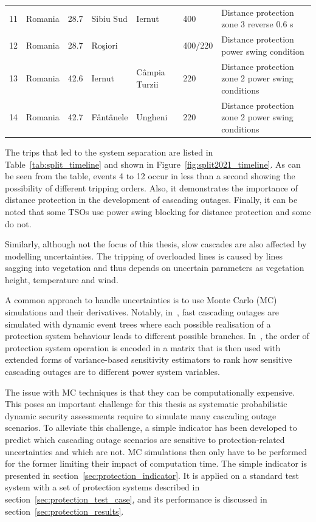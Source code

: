 \begin{table}
\begin{adjustbox}{max width=\textwidth}
\begin{tabular}{@{}lllllll@{}}
11 & Romania & 28.7      & Sibiu Sud    & Iernut         & 400          & Distance protection zone 3 reverse 0.6 s               \\
12 & Romania & 28.7      & Roşiori      &                & 400/220      & Distance protection power swing condition              \\
13 & Romania & 42.6 & Iernut & Câmpia Turzii & 220 & Distance protection zone 2 power swing conditions \\
14 & Romania & 42.7      & Fântânele    & Ungheni        & 220          & Distance protection zone 2 power swing conditions      \\ \bottomrule
\end{tabular}
\end{adjustbox}
\end{table}

The trips that led to the system separation are listed in Table~\ref{tab:split_timeline} and shown in Figure~\ref{fig:split2021_timeline}. As can be seen from the table, events 4 to 12 occur in less than a second showing the possibility of different tripping orders. Also, it demonstrates the importance of distance protection in the development of cascading outages. Finally, it can be noted that some TSOs use power swing blocking for distance protection and some do not.

Similarly, although not the focus of this thesis, slow cascades are also affected by modelling uncertainties. The tripping of overloaded lines is caused by lines sagging into vegetation and thus depends on uncertain parameters as vegetation height, temperature and wind. %

A common approach to handle uncertainties is to use Monte Carlo (MC) simulations and their derivatives. Notably, in~\cite{TwoLevelPSA}, fast cascading outages are simulated with dynamic event trees where each possible realisation of a protection system behaviour leads to different possible branches. In~\cite{SequencesRelaySobol}, the order of protection system operation is encoded in a matrix that is then used with extended forms of variance-based sensitivity estimators to rank how sensitive cascading outages are to different power system variables.

The issue with MC techniques is that they can be computationally expensive. This poses an important challenge for this thesis as systematic probabilistic dynamic security assessments require to simulate many cascading outage scenarios. To alleviate this challenge, a simple indicator has been developed to predict which cascading outage scenarios are sensitive to protection-related uncertainties and which are not. MC simulations then only have to be performed for the former limiting their impact of computation time. The simple indicator is presented in section~\ref{sec:protection_indicator}. It is applied on a standard test system with a set of protection systems described in section~\ref{sec:protection_test_case}, and its performance is discussed in section~\ref{sec:protection_results}.



